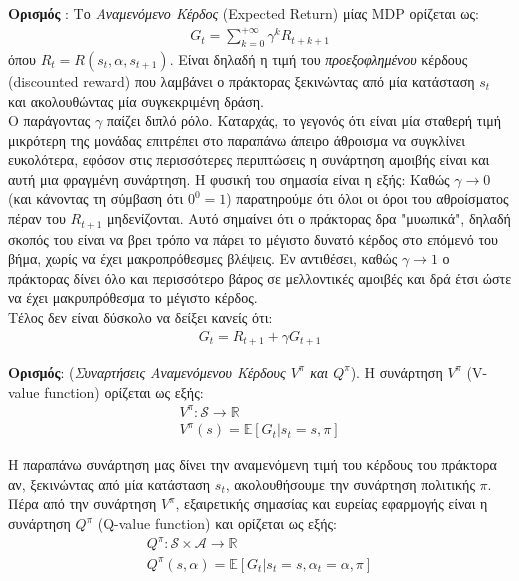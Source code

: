 \documentclass[11pt]{article} %
\numberwithin{equation}{subsection}
\begin{document}
\textbf{Ορισμός} : Το \textit{Αναμενόμενο Κέρδος} (Expected Return) μίας MDP ορίζεται ως:
\begin{align*} 
\displaystyle G_t = \sum_{k=0}^{+\infty} \gamma^k R_{t+k+1}
\end{align*}
όπου $R_t = R(s_t, \alpha, s_{t+1})$. Είναι δηλαδή η τιμή του \textit{προεξοφλημένου} κέρδους (discounted reward) που λαμβάνει ο πράκτορας ξεκινώντας από μία κατάσταση $s_t$ και ακολουθώντας μία συγκεκριμένη δράση. \\

Ο παράγοντας $\gamma$ παίζει διπλό ρόλο. Καταρχάς, το γεγονός ότι είναι μία σταθερή τιμή μικρότερη της μονάδας επιτρέπει στο παραπάνω άπειρο άθροισμα να συγκλίνει ευκολότερα, εφόσον στις περισσότερες περιπτώσεις η συνάρτηση αμοιβής είναι και αυτή μια φραγμένη συνάρτηση. Η φυσική του σημασία είναι η εξής: Καθώς $\gamma \rightarrow 0$ (και κάνοντας τη σύμβαση ότι $0^0 = 1$) παρατηρούμε ότι όλοι οι όροι του αθροίσματος πέραν του $R_{t+1}$ μηδενίζονται. Αυτό σημαίνει ότι ο πράκτορας δρα "μυωπικά", δηλαδή σκοπός του είναι να βρει τρόπο να πάρει το μέγιστο δυνατό κέρδος στο επόμενό του βήμα, χωρίς να έχει μακροπρόθεσμες βλέψεις. Εν αντιθέσει, καθώς $\gamma \rightarrow 1$ ο πράκτορας δίνει όλο και περισσότερο βάρος σε μελλοντικές αμοιβές και δρά έτσι ώστε να έχει μακρυπρόθεσμα το μέγιστο κέρδος.\\

Τέλος δεν είναι δύσκολο να δείξει κανείς ότι:
\begin{align*}
G_t = R_{t+1} + \gamma G_{t+1}
\end{align*}

\textbf{Ορισμός}: (\textit{Συναρτήσεις Αναμενόμενου Κέρδους $V^\pi$ και $Q^\pi$}). Η συνάρτηση $V^\pi$ (V-value function) ορίζεται ως εξής:
\begin{gather*}
V^\pi : \mathcal{S} \rightarrow \mathbb{R}\\
V^\pi (s) = \mathbb{E}\left[G_t | s_t = s, \mathcal{\pi} \right]
\end{gather*}

Η παραπάνω συνάρτηση μας δίνει την αναμενόμενη τιμή του κέρδους του πράκτορα αν, ξεκινώντας από μία κατάσταση $s_t$, ακολουθήσουμε την συνάρτηση πολιτικής $\mathcal{\pi}$. Πέρα από την συνάρτηση $V^\pi$, εξαιρετικής σημασίας και ευρείας εφαρμογής είναι η συνάρτηση $Q^\pi$ (Q-value function) και ορίζεται ως εξής:
\begin{gather*}
Q^\pi : \mathcal{S} \times \mathcal{A} \rightarrow \mathbb{R}\\
Q^\pi (s, \alpha) = \mathbb{E}\left[G_t | s_t = s, \alpha_t = \alpha, \mathcal{\pi} \right]
\end{gather*}
\end{document}
